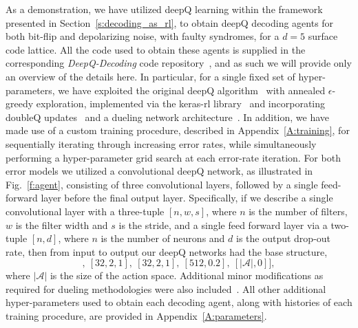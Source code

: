 \documentclass[twocolumn,preprintnumbers,amsmath,amssymb,notitlepage,nofootinbib,longbibliography,superscriptaddress,aps,pra,10pt]{revtex4-1}
\begin{document}
	As a demonstration, we have 
	utilized deepQ learning within the framework presented in Section~\ref{s:decoding_as_rl}, to obtain deepQ decoding agents for both bit-flip and depolarizing noise, with faulty syndromes, for a $d=5$ surface code lattice.
	All the code used to obtain these agents is supplied in the corresponding \textit{DeepQ-Decoding} code repository~\cite{DeepQDecoding}, and as such we will provide only an overview of the details here.
	In particular, for a single fixed set of hyper-parameters, we have exploited 
	the original deepQ algorithm~\cite{RLMnih15} with annealed $\epsilon$-greedy exploration, implemented via the keras-rl library~\cite{plappert2016kerasrl} and incorporating doubleQ updates~\cite{RLvan2016deep} and a dueling network architecture~\cite{RLwang2015dueling}.
	In addition, we have made use of a custom training procedure, described in Appendix~\ref{A:training}, for sequentially iterating through increasing error rates, while simultaneously performing a hyper-parameter grid search at each error-rate iteration.
	For both error models we utilized a convolutional deepQ network, as illustrated in Fig.~\ref{f:agent}, consisting of three convolutional layers, followed by a single feed-forward layer before the final output layer.
	Specifically, if we describe a single convolutional layer with a three-tuple $[n,w,s]$, where $n$ is the number of filters, $w$ is the filter width and $s$ is the stride, and a single feed forward layer via a two-tuple $[n,d]$, where $n$ is the number of neurons and $d$ is the output drop-out rate, then from input to output our deepQ networks had the base structure,
	\begin{equation}
		[[64,3,2],~[32,2,1],~[32,2,1],~[512,0.2],~[|\mathcal{A}|, 0]],
	\end{equation}
	where $|\mathcal{A}|$ is the size of the action space.
	Additional minor modifications as required for dueling methodologies were also included~\cite{RLwang2015dueling}.
	All other additional hyper-parameters used to obtain each decoding agent, along with histories of each training procedure, are provided in Appendix~\ref{A:parameters}.
\end{document}

